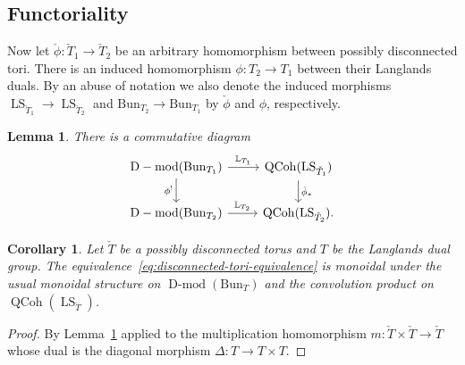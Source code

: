 \documentclass[11pt]{amsart}
\newcommand{\Bun}{{\mathrm{Bun}}}
\DeclareMathOperator{\QCoh}{QCoh}
\DeclareMathOperator{\Dmod}{D-mod}
\DeclareMathOperator{\LS}{LS}
\newtheorem{lemma}[thm]{Lemma}
\newtheorem{cor}[thm]{Corollary}
\theoremstyle{remark}
\theoremstyle{definition}
\begin{document}
\subsection{Functoriality} Now let $\check\phi\colon\check T_1\to\check T_2$ be an arbitrary homomorphism between possibly disconnected tori. There is an induced homomorphism $\phi\colon T_2\to T_1$ between their Langlands duals. By an abuse of notation we also denote the induced morphisms $\LS_{\check T_1}\to\LS_{\check T_2}$ and $\Bun_{T_2}\to\Bun_{T_1}$ by $\check\phi$ and $\phi$, respectively.
\begin{lemma}\label{lem:GLC-tori-functorial}
    There is a commutative diagram
    \[
    \begin{tikzcd}
        \Dmod(\Bun_{T_1})\arrow{r}{\mathbb L_{T_1}}\arrow[swap]{d}{\phi^!}&\QCoh(\LS_{\check T_1})\arrow{d}{\check\phi_*}\\
        \Dmod(\Bun_{T_2})\arrow{r}{\mathbb L_{T_2}}&\QCoh(\LS_{\check T_2}).
    \end{tikzcd}
    \]
\end{lemma}
\begin{cor}\label{cor:GLC-tori-monoidal-equivalence}
    Let $\check T$ be a possibly disconnected torus and $T$ be the Langlands dual group. The equivalence~\eqref{eq:disconnected-tori-equivalence} is monoidal under the usual monoidal structure on $\Dmod(\Bun_T)$ and the convolution product on $\QCoh(\LS_{\check T})$.
\end{cor}
\begin{proof}
    By Lemma~\ref{lem:GLC-tori-functorial} applied to the multiplication homomorphism $m\colon\check T\times\check T\to\check T$ whose dual is the diagonal morphism $\Delta\colon T\to T\times T$.
\end{proof}
\end{document}
